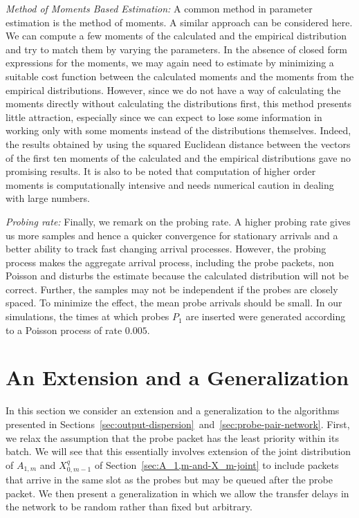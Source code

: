 \documentclass[11pt]{article}
\begin{document}
\noindent
\emph{Method of Moments Based Estimation:} A common method in
parameter estimation is the method of moments.  A similar approach can
be considered here. We can compute a few moments of the calculated and
the empirical distribution and try to match them by varying the
parameters. In the absence of closed form expressions for the moments,
we may again need to estimate by minimizing a suitable cost function
between the calculated moments and the moments from the empirical
distributions. However, since we do not have a way of calculating the
moments directly without calculating the distributions first, this
method presents little attraction, especially since we can expect to
lose some information in working only with some moments instead of the
distributions themselves.  Indeed, the results obtained by using the
squared Euclidean distance between the vectors of the first ten
moments of the calculated and the empirical distributions gave no
promising results.  It is also to be noted that computation of higher
order moments is computationally intensive and needs numerical caution
in dealing with large numbers.

\noindent
\emph{Probing rate:} Finally, we remark on the probing rate. A higher
probing rate gives us more samples and hence a quicker convergence for
stationary arrivals and a better ability to track fast changing
arrival processes. However, the probing process makes the aggregate
arrival process, including the probe packets, non Poisson and disturbs
the estimate because the calculated distribution will not be correct.
Further, the samples may not be independent if the probes are closely
spaced. To minimize the effect, the mean probe arrivals should be
small. In our simulations, the times at which probes $P_1$ are
inserted were generated according to a Poisson process of rate
$0.005.$


\section{An Extension and a Generalization}
\label{sec:generalizations}
In this section we consider an extension and a generalization to the
algorithms presented in
Sections~\ref{sec:output-dispersion}~and~\ref{sec:probe-pair-network}.
First, we relax the assumption that the probe packet has the least
priority within its batch. We will see that this essentially involves
extension of the joint distribution of $A_{1,m}$ and $X_{0,m-1}^q$ of
Section~\ref{sec:A_1,m-and-X_m-joint} to include packets that arrive
in the same slot as the probes but may be queued after the probe
packet.  We then present a generalization in which we allow the
transfer delays in the network to be random rather than fixed but
arbitrary.
\end{document}
